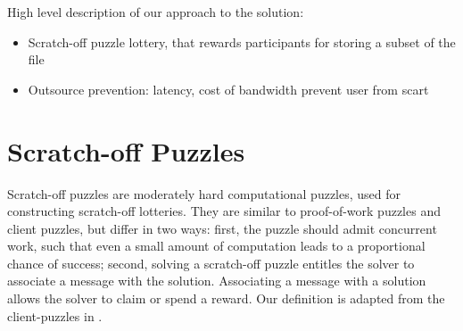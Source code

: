 \documentclass[]{article}
\theoremstyle{remark}
\begin{document}
High level description of our approach to the solution:
\begin{itemize}
\item Scratch-off puzzle lottery, that rewards participants for storing a subset of the file
\item Outsource prevention: latency, cost of bandwidth prevent user from scart
\end{itemize}


\section{Scratch-off Puzzles}

Scratch-off puzzles are moderately hard computational puzzles, used for constructing scratch-off lotteries. They are similar to proof-of-work puzzles and client puzzles, but differ in two ways: first, the puzzle should admit concurrent work, such that even a small amount of computation leads to a proportional chance of success; second, solving a scratch-off puzzle entitles the solver to associate a message with the solution. Associating a message with a solution allows the solver to claim or spend a reward. Our definition is adapted from the client-puzzles in \cite{chen2009security,stebila2011stronger}.
\end{document}
